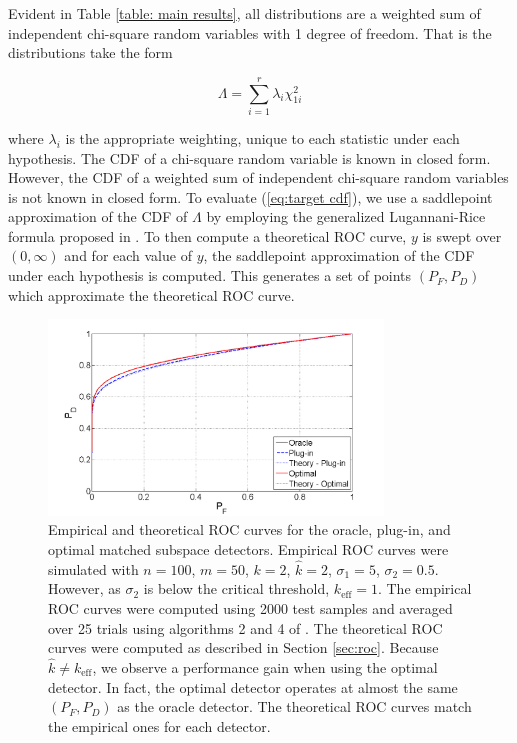 Evident in Table \ref{table: main results}, all distributions are a weighted sum of independent chi-square random variables with 1 degree of freedom. That is the distributions take the form

\begin{equation*}
\Lambda = \sum_{i=1}^r\lambda_i\chi^2_{1i}
\end{equation*}

where $\lambda_i$ is the appropriate weighting, unique to each statistic under each hypothesis. The CDF of a chi-square random variable is known in closed form. However, the CDF of a weighted sum of independent chi-square random variables is not known in closed form. To evaluate (\ref{eq:target cdf}), we use a saddlepoint approximation of the CDF of $\Lambda$ by employing the generalized Lugannani-Rice formula proposed in \cite{wood1993saddlepoint}. To then compute a theoretical ROC curve, $y$ is swept over $(0,\infty)$ and for each value of $y$, the saddlepoint approximation of the CDF under each hypothesis is computed. This generates a set of points $(P_F,P_D)$ which approximate the theoretical ROC curve.

\begin{figure}
\centering
\includegraphics[width=3.5in]{figures/roc_curves.png}
\caption{Empirical and theoretical ROC curves for the oracle, plug-in, and optimal matched subspace detectors. Empirical ROC curves were simulated with $n=100$, $m=50$, $k=2$, $\widehat{k}=2$, $\sigma_1=5$, $\sigma_2=0.5$. However, as $\sigma_2$ is below the critical threshold, $k_{\text{eff}} = 1$. The empirical ROC curves were computed using 2000 test samples and averaged over 25 trials using algorithms 2 and 4 of \cite{fawcett2006introduction}. The theoretical ROC curves were computed as described in Section \ref{sec:roc}. Because $\widehat{k}\neq k_{\text{eff}}$, we observe a performance gain when using the optimal detector. In fact, the optimal detector operates at almost the same $(P_F, P_D)$ as the oracle detector. The theoretical ROC curves match the empirical ones for each detector.}
\label{fig:roc}
\end{figure}

